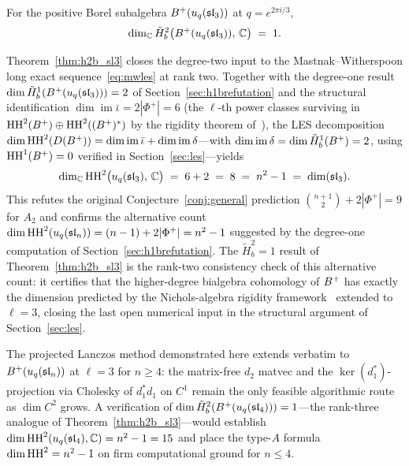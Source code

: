 \begin{theorem}[$\tilde{H}^2_b$ of the $\mathfrak{sl}_3$ positive Borel at $\ell = 3$]
\label{thm:h2b_sl3}
For the positive Borel subalgebra $B^{+}(u_q(\mathfrak{sl}_3))$ at $q = e^{2\pi i/3}$,
\[
\dim_{\mathbb{C}} \tilde{H}^2_b\bigl(B^{+}(u_q(\mathfrak{sl}_3)),\, \mathbb{C}\bigr) \;=\; 1.
\]
\end{theorem}

Theorem~\ref{thm:h2b_sl3} closes the degree-two input to the Mastnak--Witherspoon long exact sequence~\eqref{eq:mwles} at rank two. Together with the degree-one result $\dim \tilde{H}^1_b(B^{+}(u_q(\mathfrak{sl}_3))) = 2$ of Section~\ref{sec:h1brefutation} and the structural identification $\dim \operatorname{im} \bar\iota = 2|\Phi^+| = 6$ (the $\ell$-th power classes surviving in $\operatorname{HH}^2(B^{+}) \oplus \operatorname{HH}^2((B^{+})^*)$ by the rigidity theorem of~\cite{AKM15}), the LES decomposition $\dim \operatorname{HH}^2(D(B^{+})) = \dim \operatorname{im} \bar\iota + \dim \operatorname{im} \delta$---with $\dim \operatorname{im} \delta = \dim \tilde{H}^1_b(B^{+}) = 2$, using $\operatorname{HH}^1(B^{+}) = 0$ verified in Section~\ref{sec:les}---yields
\[
\dim_{\mathbb{C}} \operatorname{HH}^2\bigl(u_q(\mathfrak{sl}_3),\, \mathbb{C}\bigr) \;=\; 6 + 2 \;=\; 8 \;=\; n^2 - 1 \;=\; \dim(\mathfrak{sl}_3).
\]
This refutes the original Conjecture~\ref{conj:general} prediction $\binom{n+1}{2} + 2|\Phi^+| = 9$ for $A_2$ and confirms the alternative count $\dim \operatorname{HH}^2(u_q(\mathfrak{sl}_n)) = (n-1) + 2|\Phi^+| = n^2 - 1$ suggested by the degree-one computation of Section~\ref{sec:h1brefutation}. The $\tilde{H}^2_b = 1$ result of Theorem~\ref{thm:h2b_sl3} is the rank-two consistency check of this alternative count: it certifies that the higher-degree bialgebra cohomology of $B^{+}$ has exactly the dimension predicted by the Nichols-algebra rigidity framework~\cite{AKM15} extended to $\ell = 3$, closing the last open numerical input in the structural argument of Section~\ref{sec:les}.

The projected Lanczos method demonstrated here extends verbatim to $B^{+}(u_q(\mathfrak{sl}_n))$ at $\ell = 3$ for $n \geq 4$: the matrix-free $d_2$ matvec and the $\ker(d_1^*)$-projection via Cholesky of $d_1^* d_1$ on $C^1$ remain the only feasible algorithmic route as $\dim C^2$ grows. A verification of $\dim \tilde{H}^2_b(B^{+}(u_q(\mathfrak{sl}_4))) = 1$---the rank-three analogue of Theorem~\ref{thm:h2b_sl3}---would establish $\dim \operatorname{HH}^2(u_q(\mathfrak{sl}_4), \mathbb{C}) = n^2 - 1 = 15$ and place the type-$A$ formula $\dim \operatorname{HH}^2 = n^2 - 1$ on firm computational ground for $n \leq 4$.
